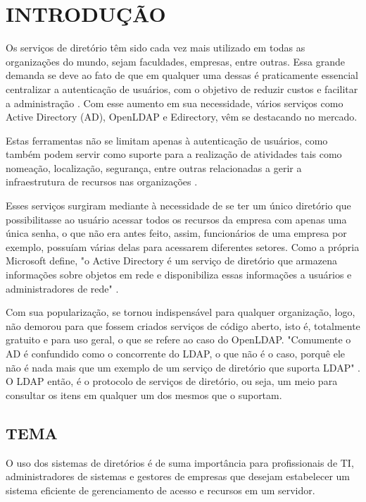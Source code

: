 \newpage

\section{INTRODUÇÃO}
\label{sec:introdução}
Os serviços de diretório têm sido cada vez mais utilizado em todas as
organizações do mundo, sejam faculdades, empresas, entre outras. Essa
grande demanda se deve ao fato de que em qualquer uma dessas é praticamente essencial centralizar a autenticação de usuários, com o objetivo de reduzir custos e facilitar a administração \cite{berbelini}. Com esse aumento em sua necessidade, vários serviços como Active Directory (AD), OpenLDAP e Edirectory, vêm se destacando no mercado.

Estas ferramentas não se limitam apenas à autenticação de usuários, como também podem servir como suporte para a realização de atividades tais como nomeação, localização, segurança, entre outras relacionadas a gerir a infraestrutura de recursos nas organizações \cite{cruz2023}.

Esses serviços surgiram mediante à necessidade de se ter um único diretório que possibilitasse ao usuário acessar todos os recursos da empresa com apenas uma única senha, o que não era antes feito, assim, funcionários de uma empresa por exemplo, possuíam várias delas para acessarem diferentes setores. Como a própria Microsoft define, "o  Active  Directory é  um  serviço  de  diretório  que  armazena  informações sobre objetos em rede e disponibiliza essas informações a usuários e administradores de rede" \cite{microsoftlearn}.

Com sua popularização, se tornou indispensável para qualquer organização, logo,  não demorou para que fossem criados serviços de código aberto, isto é, totalmente gratuito e para uso geral, o que se refere ao caso do OpenLDAP. "Comumente o AD é confundido como o concorrente do LDAP, o que não é o caso, porquê ele não é nada mais que um exemplo de um serviço de diretório que suporta LDAP" \cite{bertolli}. O LDAP então, é o protocolo de serviços de diretório, ou seja, um meio para consultar os itens em qualquer um dos mesmos que o suportam.


\subsection{TEMA}
\label{subsec:tema}
O uso dos sistemas de diretórios é de suma importância para profissionais de TI, administradores de sistemas e gestores de empresas que desejam estabelecer um sistema eficiente de gerenciamento de acesso e recursos em um servidor.

